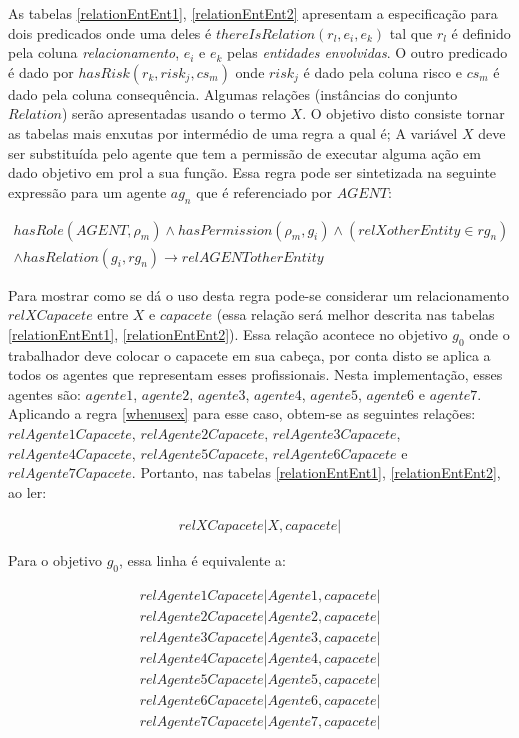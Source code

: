 As tabelas \ref{relationEntEnt1}, \ref{relationEntEnt2} apresentam a especificação para dois predicados onde uma deles é $thereIsRelation(r_l,e_i,e_k)$ 
tal que $r_l$ é definido pela coluna \textit{relacionamento}, $e_i$ e $e_k$ pelas \textit{entidades envolvidas}. 
O outro predicado é dado por $hasRisk(r_k,risk_j,cs_m)$ onde $risk_j$ é dado pela coluna risco e $cs_m$ é dado pela coluna consequência. 
Algumas relações (instâncias do conjunto $Relation$) serão apresentadas usando o termo $X$. O objetivo disto consiste tornar as tabelas mais enxutas por intermédio de uma regra a qual é;
A variável $X$ deve ser substituída pelo agente que tem a permissão de executar alguma ação em dado objetivo em prol a sua função. 
Essa regra pode ser sintetizada na seguinte expressão para um agente $ag_n$ que é referenciado por $AGENT$:

\begin{eqnarray}\label{whenusex} \nonumber
    hasRole(AGENT,\rho_m) \wedge hasPermission(\rho_m,g_i) \wedge (relXotherEntity \in rg_n)  \\ 
    \wedge hasRelation(g_i,rg_n) \to relAGENTotherEntity 
\end{eqnarray}


Para mostrar como se dá o uso desta regra pode-se considerar um relacionamento $ relXCapacete$ entre $X$ e $capacete$ (essa relação será melhor descrita nas tabelas \ref{relationEntEnt1}, \ref{relationEntEnt2}). Essa relação acontece no objetivo $g_0$
onde o trabalhador deve colocar o capacete em sua cabeça, por conta disto se aplica a todos os agentes que representam esses profissionais. Nesta implementação, esses agentes são: $agente1$, $agente2$, $agente3$, $agente4$, $agente5$, 
$agente6$ e $agente7$. Aplicando a regra \ref{whenusex} para esse caso, obtem-se as seguintes relações: $relAgente1Capacete$, $relAgente2Capacete$, $relAgente3Capacete$, $relAgente4Capacete$, $relAgente5Capacete$, $relAgente6Capacete$ e 
$relAgente7Capacete$. Portanto, nas tabelas \ref{relationEntEnt1}, \ref{relationEntEnt2}, ao ler:  

\begin{eqnarray}
	relXCapacete | X,capacete |
\end{eqnarray}

Para o objetivo $g_0$, essa linha é equivalente a: 

\begin{eqnarray}
relAgente1Capacete | Agente1 ,capacete | \nonumber \\
relAgente2Capacete | Agente2 ,capacete | \nonumber \\ 
relAgente3Capacete | Agente3 ,capacete | \nonumber \\ 
relAgente4Capacete | Agente4 ,capacete | \nonumber \\
relAgente5Capacete | Agente5 ,capacete | \nonumber \\
relAgente6Capacete | Agente6 ,capacete | \nonumber \\
relAgente7Capacete | Agente7 ,capacete | \nonumber \\
\nonumber \\
\end{eqnarray}

